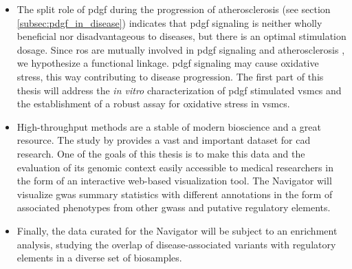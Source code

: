 \begin{itemize}
    \item The split role of \ac{pdgf} during the progression of atherosclerosis (see section \ref{subsec:pdgf_in_disease}) indicates that \ac{pdgf} signaling is neither wholly beneficial nor disadvantageous to diseases, but there is an optimal stimulation dosage. Since \ac{ros} are mutually involved in \ac{pdgf} signaling \cite{sundaresanRequirementGenerationH2O21995, bouziguesRegulationROSResponse2014a} and atherosclerosis \cite{burtenshawReactiveOxygenSpecies2019}, we hypothesize a functional linkage. \ac{pdgf} signaling may cause oxidative stress, this way contributing to disease progression. The first part of this thesis will address the \textit{in vitro} characterization of \ac{pdgf} stimulated \acp{vsmc} and the establishment of a robust assay for oxidative stress in \acp{vsmc}.
    \item High-throughput methods are a stable of modern bioscience and a great resource. The study by \textcite{aragamDiscoverySystematicCharacterization2021} provides a vast and important dataset for \ac{cad} research. One of the goals of this thesis is to make this data and the evaluation of its genomic context easily accessible to medical researchers in the form of an interactive web-based visualization tool. The  Navigator will visualize \ac{gwas} summary statistics with different annotations in the form of associated phenotypes from other \acp{gwas} and putative regulatory elements.
    \item Finally, the data curated for the  Navigator will be subject to an enrichment analysis, studying the overlap of disease-associated variants with regulatory elements in a diverse set of biosamples.
\end{itemize}

